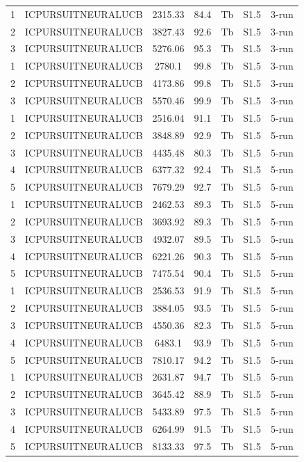 \documentclass[11pt]{article}
\begin{document}
\begin{center}
\begin{longtable}{|c|c|c|c|c|c|c|}
1 & ICPURSUITNEURALUCB & 2315.33 & 84.4 & Tb & S1.5 & 3-run \\
2 & ICPURSUITNEURALUCB & 3827.43 & 92.6 & Tb & S1.5 & 3-run \\
3 & ICPURSUITNEURALUCB & 5276.06 & 95.3 & Tb & S1.5 & 3-run \\
1 & ICPURSUITNEURALUCB & 2780.1 & 99.8 & Tb & S1.5 & 3-run \\
2 & ICPURSUITNEURALUCB & 4173.86 & 99.8 & Tb & S1.5 & 3-run \\
3 & ICPURSUITNEURALUCB & 5570.46 & 99.9 & Tb & S1.5 & 3-run \\
1 & ICPURSUITNEURALUCB & 2516.04 & 91.1 & Tb & S1.5 & 5-run \\
2 & ICPURSUITNEURALUCB & 3848.89 & 92.9 & Tb & S1.5 & 5-run \\
3 & ICPURSUITNEURALUCB & 4435.48 & 80.3 & Tb & S1.5 & 5-run \\
4 & ICPURSUITNEURALUCB & 6377.32 & 92.4 & Tb & S1.5 & 5-run \\
5 & ICPURSUITNEURALUCB & 7679.29 & 92.7 & Tb & S1.5 & 5-run \\
1 & ICPURSUITNEURALUCB & 2462.53 & 89.3 & Tb & S1.5 & 5-run \\
2 & ICPURSUITNEURALUCB & 3693.92 & 89.3 & Tb & S1.5 & 5-run \\
3 & ICPURSUITNEURALUCB & 4932.07 & 89.5 & Tb & S1.5 & 5-run \\
4 & ICPURSUITNEURALUCB & 6221.26 & 90.3 & Tb & S1.5 & 5-run \\
5 & ICPURSUITNEURALUCB & 7475.54 & 90.4 & Tb & S1.5 & 5-run \\
1 & ICPURSUITNEURALUCB & 2536.53 & 91.9 & Tb & S1.5 & 5-run \\
2 & ICPURSUITNEURALUCB & 3884.05 & 93.5 & Tb & S1.5 & 5-run \\
3 & ICPURSUITNEURALUCB & 4550.36 & 82.3 & Tb & S1.5 & 5-run \\
4 & ICPURSUITNEURALUCB & 6483.1 & 93.9 & Tb & S1.5 & 5-run \\
5 & ICPURSUITNEURALUCB & 7810.17 & 94.2 & Tb & S1.5 & 5-run \\
1 & ICPURSUITNEURALUCB & 2631.87 & 94.7 & Tb & S1.5 & 5-run \\
2 & ICPURSUITNEURALUCB & 3645.42 & 88.9 & Tb & S1.5 & 5-run \\
3 & ICPURSUITNEURALUCB & 5433.89 & 97.5 & Tb & S1.5 & 5-run \\
4 & ICPURSUITNEURALUCB & 6264.99 & 91.5 & Tb & S1.5 & 5-run \\
5 & ICPURSUITNEURALUCB & 8133.33 & 97.5 & Tb & S1.5 & 5-run \\

\end{longtable}
\end{center}
\end{document}
